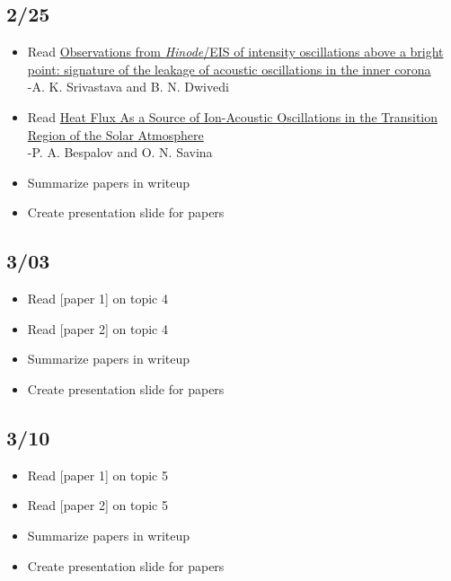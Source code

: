 \documentclass[12pt]{article}
\begin{document}
\subsection*{2/25}
\begin{itemize}
    \item Read
        \href{http://cdsads.u-strasbg.fr/abs/2010MNRAS.405.2317S}
        {\textcolor{cobalt}{Observations from \emph{Hinode}/EIS of
        intensity oscillations above a bright point: signature of the
        leakage of acoustic oscillations in the inner corona}}\\
        -A. K. Srivastava and B. N. Dwivedi
    \item Read
        \href{http://cdsads.u-strasbg.fr/abs/2009AstL...35..343B}
        {\textcolor{cobalt}{Heat Flux As a Source of Ion-Acoustic
        Oscillations in the Transition Region of the Solar
        Atmosphere}}\\
        -P. A. Bespalov and O. N. Savina
    \item Summarize papers in writeup
    \item Create presentation slide for papers
\end{itemize}

\subsection*{3/03}
\begin{itemize}
    \item Read [paper 1] on topic 4
    \item Read [paper 2] on topic 4
    \item Summarize papers in writeup
    \item Create presentation slide for papers
\end{itemize}

\subsection*{3/10}
\begin{itemize}
    \item Read [paper 1] on topic 5
    \item Read [paper 2] on topic 5
    \item Summarize papers in writeup
    \item Create presentation slide for papers
\end{itemize}
\end{document}
